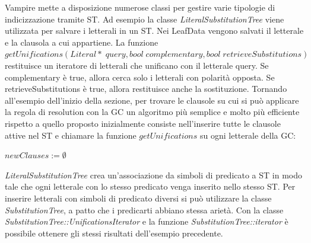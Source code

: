 \documentclass[./main.tex]{subfiles}
\begin{document}
Vampire mette a disposizione numerose classi per gestire varie tipologie di indicizzazione tramite ST.
Ad esempio la classe \textit{LiteralSubstitutionTree} viene utilizzata per salvare i letterali in un ST.
Nei LeafData vengono salvati il letterale e la clausola a cui appartiene.
La funzione $getUnifications(Literal*\; query, bool\; complementary, bool\; retrieveSubstitutions)$ 
restituisce un iteratore di 
letterali che unificano con il letterale query. Se complementary è true, allora cerca solo i letterali con polarità opposta.
Se retrieveSubstitutions è true, allora restituisce anche la sostituzione.
Tornando all'esempio dell'inizio della sezione, per trovare le clausole su cui si può applicare la regola di resolution
con la GC un algoritmo più semplice e molto più efficiente rispetto a quello proposto inizialmente
consiste nell'inserire tutte le clausole attive nel ST e
chiamare la funzione $getUnifications$ su ogni letterale della GC:

$newClauses := \emptyset$\;\\


\textit{LiteralSubstitutionTree} crea un'associazione da simboli di predicato a ST in modo tale che ogni letterale 
con lo stesso predicato venga inserito nello stesso ST. 
Per inserire letterali con simboli di predicato diversi si può utilizzare la classe \textit{SubstitutionTree}, a patto 
che i predicarti abbiano stessa arietà. Con la classe \textit{SubstitutionTree::UnificationsIterator} e 
la funzione \textit{SubstitutionTree::iterator} è possibile ottenere gli stessi risultati dell'esempio precedente.
\end{document}
